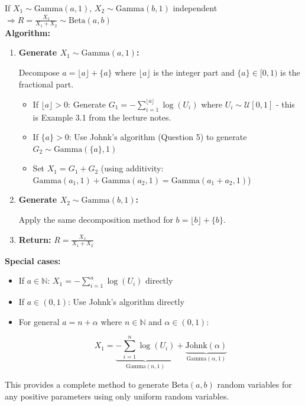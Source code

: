 If $X_1 \sim \text{Gamma}(a,1)$, $X_2 \sim \text{Gamma}(b,1)$ independent $\Rightarrow R = \frac{X_1}{X_1 + X_2} \sim \text{Beta}(a,b)$
\\[2mm]
\textbf{Algorithm:}
\begin{enumerate}
    \item \textbf{Generate $X_1 \sim \text{Gamma}(a,1)$:}

Decompose $a=\lfloor a \rfloor + \{a\}$ where $\lfloor a \rfloor$ is the integer part and $\{a\} \in [0,1)$ is the fractional part.

\begin{itemize}
   \item If $\lfloor a \rfloor > 0$: Generate $G_1 = -\sum_{i=1}^{\lfloor a \rfloor} \log(U_i)$ where $U_i \sim \mathcal{U}[0,1]$ - this is Example 3.1 from the lecture notes.
   \item If $\{a\} > 0$: Use Johnk's algorithm (Question 5) to generate $G_2 \sim \text{Gamma}(\{a\},1)$
   \item Set $X_1 = G_1 + G_2$ (using additivity: $\text{Gamma}(a_1,1)+\text{Gamma}(a_2,1)=\text{Gamma}(a_1+a_2,1)$)
\end{itemize}

\item \textbf{Generate $X_2 \sim \text{Gamma}(b,1)$:}

Apply the same decomposition method for $b=\lfloor b \rfloor + \{b\}$.
\item \textbf{Return:} $R=\frac{X_1}{X_1 + X_2}$
\end{enumerate}

\textbf{Special cases:}
\begin{itemize}
\item If $a \in \mathbb{N}$: $X_1 = -\sum_{i=1}^{a} \log(U_i)$ directly
\item If $a \in (0,1)$: Use Johnk's algorithm directly
\item For general $a=n+\alpha$ where $n \in \mathbb{N}$ and $\alpha \in (0,1)$:

 $$X_1 = \underbrace{-\sum_{i=1}^{n} \log(U_i)}_{\text{Gamma}(n, 1)} + \underbrace{\text{Johnk}(\alpha)}_{\text{Gamma}(\alpha, 1)}$$
\end{itemize}

This provides a complete method to generate $\text{Beta}(a,b)$ random variables for any positive parameters using only uniform random variables.

